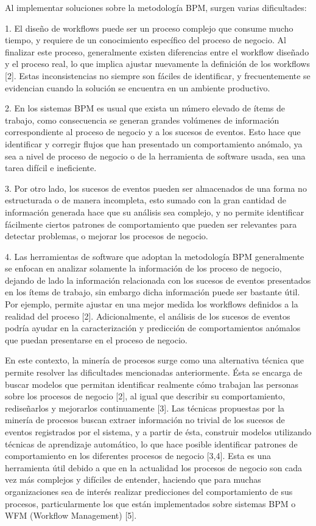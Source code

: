 Al implementar soluciones sobre la metodología BPM, surgen varias dificultades:

1. El diseño de workflows puede ser un proceso complejo que consume mucho tiempo, y requiere de un conocimiento específico del proceso de negocio. Al finalizar este proceso, generalmente existen diferencias entre el workflow diseñado y el proceso real, lo que implica ajustar nuevamente la definición de los workflows [2]. Estas inconsistencias no siempre son fáciles de identificar, y frecuentemente se evidencian cuando la solución se encuentra en un ambiente productivo.

2. En los sistemas BPM es usual que exista un número elevado de ítems de trabajo, como consecuencia se generan grandes volúmenes de información correspondiente al proceso de negocio y a los sucesos de eventos. Esto hace que identificar y corregir flujos que han presentado un comportamiento anómalo, ya sea a nivel de proceso de negocio o de la herramienta de software usada, sea una tarea difícil e ineficiente.

3. Por otro lado, los sucesos de eventos pueden ser almacenados de una forma no estructurada o de manera incompleta, esto sumado con la gran cantidad de información generada hace que su análisis sea complejo, y no permite identificar fácilmente ciertos patrones de comportamiento que pueden ser relevantes para detectar problemas, o mejorar los procesos de negocio.

4. Las herramientas de software que adoptan la metodología BPM generalmente se enfocan en analizar solamente la información de los proceso de negocio, dejando de lado la información relacionada con los sucesos de eventos presentados en los ítems de trabajo, sin embargo dicha información puede ser bastante útil. Por ejemplo, permite ajustar en una mejor medida los workflows definidos a la realidad del proceso [2]. Adicionalmente, el análisis de los sucesos de eventos podría ayudar en la caracterización y predicción de comportamientos anómalos que puedan presentarse en el proceso de negocio.

En este contexto, la minería de procesos surge como una alternativa técnica que permite resolver las dificultades mencionadas anteriormente. Ésta se encarga de buscar modelos que permitan identificar realmente cómo trabajan las personas sobre los procesos de negocio [2], al igual que describir su comportamiento, rediseñarlos y mejorarlos continuamente [3]. Las técnicas propuestas por la minería de procesos buscan extraer información no trivial de los sucesos de eventos registrados por el sistema, y a partir de ésta, construir modelos utilizando técnicas de aprendizaje automático, lo que hace posible identificar patrones de comportamiento en los diferentes procesos de negocio [3,4]. Esta es una herramienta útil debido a que en la actualidad los procesos de negocio son cada vez más complejos y difíciles de entender, haciendo que para muchas organizaciones sea de interés realizar predicciones del comportamiento de sus procesos, particularmente los que están implementados sobre sistemas BPM o WFM (Workflow Management) [5].

